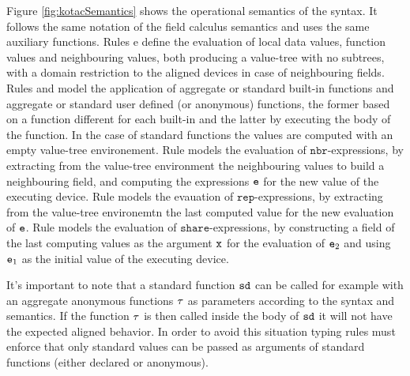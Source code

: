 Figure \ref{fig:kotacSemantics} shows the operational semantics of the syntax. It follows the same notation of the field calculus semantics and uses the same auxiliary functions. Rules  e  define the evaluation of local data values, function values and neighbouring values, both producing a value-tree with no subtrees, with a domain restriction to the aligned devices in case of neighbouring fields. Rules  and  model the application of aggregate or standard built-in functions and aggregate or standard user defined (or anonymous) functions, the former based on a function different for each built-in and the latter by executing the body of the function. In the case of standard functions the values are computed with an empty value-tree environement. Rule  models the evaluation of $\mathtt{nbr}$-expressions, by extracting from the value-tree environment the neighbouring values to build a neighbouring field, and computing the expressions $\mathtt{e}$ for the new value of the executing device. Rule  models the evauation of $\mathtt{rep}$-expressions, by extracting from the value-tree environemtn the last computed value for the new evaluation of $\mathtt{e}$. Rule  models the evaluation of $\mathtt{share}$-expressions, by constructing a field of the last computing values as the argument $\mathtt{x}$ for the evaluation of $\mathtt{e}_2$ and using $\mathtt{e}_1$ as the initial value of the executing device.

It's important to note that a standard function $\mathtt{sd}$ can be called for example with an aggregate anonymous functions $\tau$ as parameters according to the syntax and semantics. If the function $\tau$ is then called inside the body of $\mathtt{sd}$ it will not have the expected aligned behavior. In order to avoid this situation typing rules must enforce that only standard values can be passed as arguments of standard functions (either declared or anonymous).

